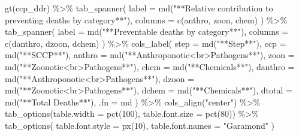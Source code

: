 \documentclass[
  letterpaper,
  DIV=11,
  numbers=noendperiod]{scrartcl}
\newenvironment{Shaded}{\begin{snugshade}}{\end{snugshade}}
\newcommand{\AttributeTok}[1]{\textcolor[rgb]{0.40,0.45,0.13}{#1}}
\newcommand{\DecValTok}[1]{\textcolor[rgb]{0.68,0.00,0.00}{#1}}
\newcommand{\FunctionTok}[1]{\textcolor[rgb]{0.28,0.35,0.67}{#1}}
\newcommand{\NormalTok}[1]{\textcolor[rgb]{0.00,0.23,0.31}{#1}}
\newcommand{\SpecialCharTok}[1]{\textcolor[rgb]{0.37,0.37,0.37}{#1}}
\newcommand{\StringTok}[1]{\textcolor[rgb]{0.13,0.47,0.30}{#1}}
\begin{document}
\begin{Shaded}
\begin{Highlighting}[]
\FunctionTok{gt}\NormalTok{(ccp\_ddr) }\SpecialCharTok{\%\textgreater{}\%} 
  \FunctionTok{tab\_spanner}\NormalTok{(}
    \AttributeTok{label =} \FunctionTok{md}\NormalTok{(}\StringTok{"**Relative contribution to preventing deaths by category**"}\NormalTok{),}
    \AttributeTok{columns =} \FunctionTok{c}\NormalTok{(anthro, zoon, chem)}
\NormalTok{  ) }\SpecialCharTok{\%\textgreater{}\%} 
  \FunctionTok{tab\_spanner}\NormalTok{(}
  \AttributeTok{label =} \FunctionTok{md}\NormalTok{(}\StringTok{"**Preventable deaths by category**"}\NormalTok{),}
  \AttributeTok{columns =} \FunctionTok{c}\NormalTok{(danthro, dzoon, dchem)}
\NormalTok{  ) }\SpecialCharTok{\%\textgreater{}\%} 
  \FunctionTok{cols\_label}\NormalTok{(}
\AttributeTok{step =} \FunctionTok{md}\NormalTok{(}\StringTok{"**Step**"}\NormalTok{),}
\AttributeTok{ccp =} \FunctionTok{md}\NormalTok{(}\StringTok{"**SCCP**"}\NormalTok{),}
\AttributeTok{anthro =} \FunctionTok{md}\NormalTok{(}\StringTok{"**Anthroponotic\textless{}br\textgreater{}Pathogens**"}\NormalTok{),}
\AttributeTok{zoon =} \FunctionTok{md}\NormalTok{(}\StringTok{"**Zoonotic\textless{}br\textgreater{}Pathogens**"}\NormalTok{),}
\AttributeTok{chem =} \FunctionTok{md}\NormalTok{(}\StringTok{"**Chemicals**"}\NormalTok{),}
\AttributeTok{danthro =} \FunctionTok{md}\NormalTok{(}\StringTok{"**Anthroponotic\textless{}br\textgreater{}Pathogens**"}\NormalTok{),}
\AttributeTok{dzoon =} \FunctionTok{md}\NormalTok{(}\StringTok{"**Zoonotic\textless{}br\textgreater{}Pathogens**"}\NormalTok{),}
\AttributeTok{dchem =} \FunctionTok{md}\NormalTok{(}\StringTok{"**Chemicals**"}\NormalTok{),}
\AttributeTok{dtotal =} \FunctionTok{md}\NormalTok{(}\StringTok{"**Total Deaths**"}\NormalTok{),}
\AttributeTok{.fn =}\NormalTok{ md}
\NormalTok{) }\SpecialCharTok{\%\textgreater{}\%} 
  \FunctionTok{cols\_align}\NormalTok{(}\StringTok{"center"}\NormalTok{) }\SpecialCharTok{\%\textgreater{}\%} 
\FunctionTok{tab\_options}\NormalTok{(}\AttributeTok{table.width =} \FunctionTok{pct}\NormalTok{(}\DecValTok{100}\NormalTok{), }\AttributeTok{table.font.size =} \FunctionTok{pct}\NormalTok{(}\DecValTok{80}\NormalTok{)) }\SpecialCharTok{\%\textgreater{}\%} 
  \FunctionTok{tab\_options}\NormalTok{(}
    \AttributeTok{table.font.style =} \FunctionTok{px}\NormalTok{(}\DecValTok{10}\NormalTok{),}
    \AttributeTok{table.font.names =} \StringTok{"Garamond"}
\NormalTok{  )}
\end{Highlighting}
\end{Shaded}
\end{document}
